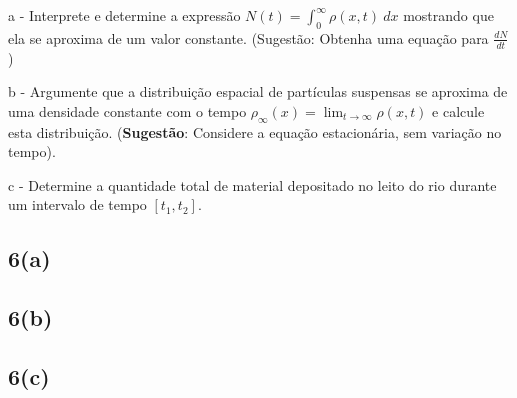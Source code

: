 \begin{description}
\item a - Interprete e determine a expressão $N(t) = \displaystyle\int_{0}^{\infty} \rho(x, t)\ dx$ mostrando que ela se aproxima de um valor constante. {\tiny (Sugestão: Obtenha uma equação para $\frac{dN}{dt}$)}

\item b - Argumente que a distribuição espacial de partículas suspensas se aproxima de uma densidade constante com o tempo $\rho_\infty(x) = \displaystyle\lim_{t \to \infty} \rho(x, t)$ e calcule esta distribuição. {\tiny (\textbf{Sugestão}: Considere a equação estacionária, sem variação no tempo).}

\item c - Determine a quantidade total de material depositado no leito do rio durante um intervalo de tempo $[t_1,t_2]$.
\end{description}



\subsection*{6(a)}


\subsection*{6(b)}


\subsection*{6(c)}



\clearpage
